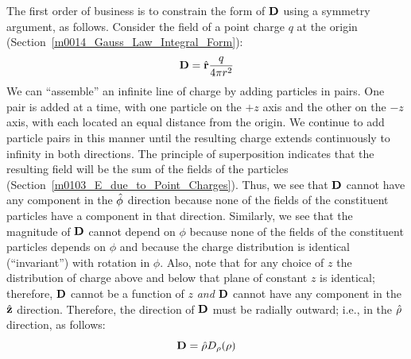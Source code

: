 \begin{example}
\begin{mdframed}[backgroundcolor=brown!20,linecolor=brown!20]
The first order of business is to constrain the form of ${\bf D}$ using a symmetry argument, 
as follows.
Consider the field of a point charge $q$ at the origin (Section~\ref{m0014_Gauss_Law_Integral_Form}): 
%
\begin{equation}   
{\bf D}  = \hat{\bf r}\frac{q}{4\pi r^2}
\end{equation}
%
We can ``assemble'' an infinite line of charge by adding particles in pairs.
One pair is added at a time, with one particle on the $+z$ axis and the other on the $-z$ axis, with each located an equal distance from the origin. 
We continue to add particle pairs in this manner until the resulting charge extends continuously to infinity in both directions.
The principle of superposition indicates that the resulting field will be the sum of the fields of the particles (Section~\ref{m0103_E_due_to_Point_Charges}).
Thus, we see that ${\bf D}$ cannot have any component in the $\hat{\bf \phi}$ direction because none of the fields of the constituent particles have a component in that direction.
Similarly, we see that the magnitude of ${\bf D}$ cannot depend on $\phi$ because none of the fields of the constituent particles depends on $\phi$ and because the charge distribution is identical (``invariant'') with rotation in $\phi$.
Also, note that for any choice of $z$ the distribution of charge above and below that plane of constant $z$ is identical; therefore, ${\bf D}$ cannot be a function of $z$ \emph{and} ${\bf D}$  cannot have any component in the $\hat{\bf z}$ direction.
Therefore, the direction of ${\bf D}$ must be radially outward; i.e., in the $\hat{\bf \rho}$ direction, as follows:
%
\begin{equation}
{\bf D} = \hat{\bf \rho}D_{\rho}(\rho)
\end{equation}


\end{mdframed}
\end{example}
